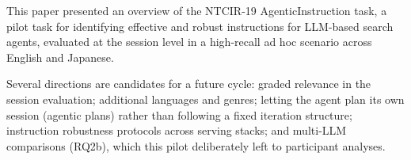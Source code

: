 \documentclass[sigconf,article]{acmart}
\begin{document}
This paper presented an overview of the NTCIR-19 AgenticInstruction task, a
pilot task for identifying effective and robust instructions for LLM-based
search agents, evaluated at the session level in a high-recall ad hoc
scenario across English and Japanese.

Several directions are candidates for a future cycle: graded relevance in
the session evaluation; additional languages and genres; letting the agent
plan its own session (agentic plans) rather than following a fixed
iteration structure; instruction robustness protocols across serving stacks;
and multi-LLM comparisons (RQ2b), which this pilot deliberately left to
participant analyses.

\begin{acks}
\end{acks}



\end{document}
